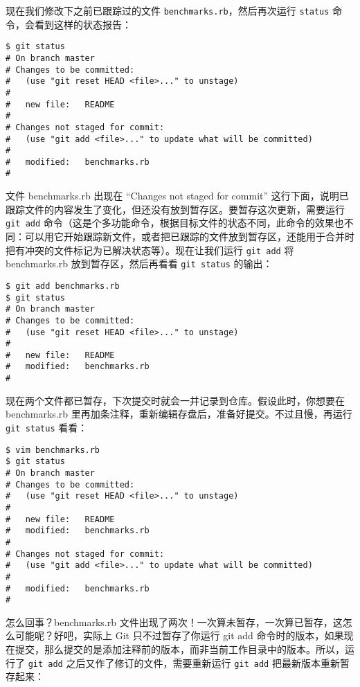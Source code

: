 \documentclass[a4paper]{book}
\begin{document}
现在我们修改下之前已跟踪过的文件 \texttt{benchmarks.rb}，然后再次运行 \texttt{status} 命令，会看到这样的状态报告：

\begin{shaded}\begin{verbatim}
$ git status
# On branch master
# Changes to be committed:
#   (use "git reset HEAD <file>..." to unstage)
#
#	new file:   README
#
# Changes not staged for commit:
#   (use "git add <file>..." to update what will be committed)
#
#	modified:   benchmarks.rb
#
\end{verbatim}\end{shaded}

文件 benchmarks.rb 出现在 “Changes not staged for commit” 这行下面，说明已跟踪文件的内容发生了变化，但还没有放到暂存区。要暂存这次更新，需要运行 \texttt{git add} 命令（这是个多功能命令，根据目标文件的状态不同，此命令的效果也不同：可以用它开始跟踪新文件，或者把已跟踪的文件放到暂存区，还能用于合并时把有冲突的文件标记为已解决状态等）。现在让我们运行 \texttt{git add} 将 benchmarks.rb 放到暂存区，然后再看看 \texttt{git status} 的输出：

\begin{shaded}\begin{verbatim}
$ git add benchmarks.rb
$ git status
# On branch master
# Changes to be committed:
#   (use "git reset HEAD <file>..." to unstage)
#
#	new file:   README
#	modified:   benchmarks.rb
#
\end{verbatim}\end{shaded}

现在两个文件都已暂存，下次提交时就会一并记录到仓库。假设此时，你想要在 benchmarks.rb 里再加条注释，重新编辑存盘后，准备好提交。不过且慢，再运行 \texttt{git status} 看看：

\begin{shaded}\begin{verbatim}
$ vim benchmarks.rb 
$ git status
# On branch master
# Changes to be committed:
#   (use "git reset HEAD <file>..." to unstage)
#
#	new file:   README
#	modified:   benchmarks.rb
#
# Changes not staged for commit:
#   (use "git add <file>..." to update what will be committed)
#
#	modified:   benchmarks.rb
#
\end{verbatim}\end{shaded}

怎么回事？benchmarks.rb 文件出现了两次！一次算未暂存，一次算已暂存，这怎么可能呢？好吧，实际上 Git 只不过暂存了你运行 git add 命令时的版本，如果现在提交，那么提交的是添加注释前的版本，而非当前工作目录中的版本。所以，运行了 \texttt{git add} 之后又作了修订的文件，需要重新运行 \texttt{git add} 把最新版本重新暂存起来：
\end{document}
